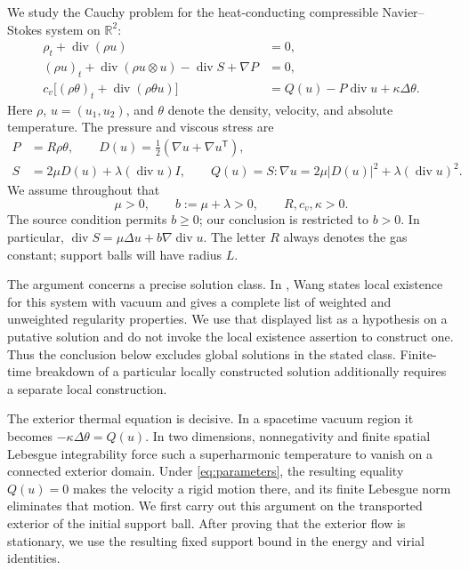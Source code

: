 \documentclass[10pt,twoside]{article}
\newcommand{\R}{\mathbb R}
\newcommand{\Div}{\operatorname{div}}
\begin{document}
We study the Cauchy problem for the heat-conducting compressible
Navier--Stokes system on $\R^2$:
\begin{align}
 \rho_t+\Div(\rho u)&=0,\label{eq:mass}\\
 (\rho u)_t+\Div(\rho u\otimes u)-\Div S+\nabla P&=0,
 \label{eq:momentum}\\
 c_v\bigl[(\rho\theta)_t+\Div(\rho\theta u)\bigr]
 &=Q(u)-P\Div u+\kappa\Delta\theta.\label{eq:thermal}
\end{align}
Here $\rho$, $u=(u_1,u_2)$, and $\theta$ denote the density, velocity,
and absolute temperature. The pressure and viscous stress are
\begin{equation}
 \begin{aligned}
 P&=R\rho\theta,\qquad
 D(u)=\tfrac12(\nabla u+\nabla u^{\mathsf T}),\\
 S&=2\mu D(u)+\lambda(\Div u)I,\qquad
 Q(u)=S:\nabla u
       =2\mu|D(u)|^2+\lambda(\Div u)^2.
 \end{aligned}\label{eq:stress}
\end{equation}
We assume throughout that
\begin{equation}
 \mu>0,\qquad b:=\mu+\lambda>0,\qquad R,c_v,\kappa>0.
 \label{eq:parameters}
\end{equation}
The source condition \cite[(1.2)]{WangV1} permits $b\ge0$;
our conclusion is restricted to $b>0$.
In particular, $\Div S=\mu\Delta u+b\nabla\Div u$. The letter $R$
always denotes the gas constant; support balls will have radius $L$.

The argument concerns a precise solution class. In
\cite[Theorem 1.1]{WangV1}, Wang states local existence for this system
with vacuum and gives a complete list of weighted and unweighted
regularity properties. We use that displayed list as a hypothesis on
a putative solution and do not invoke the local existence assertion
to construct one. Thus the conclusion below excludes global
solutions in the stated class. Finite-time breakdown of a particular
locally constructed solution additionally requires a separate local
construction.

The exterior thermal equation is decisive. In a spacetime vacuum
region it becomes $-\kappa\Delta\theta=Q(u)$. In two dimensions,
nonnegativity and finite spatial Lebesgue integrability force such a
superharmonic temperature to vanish on a connected exterior domain.
Under \eqref{eq:parameters}, the resulting equality $Q(u)=0$ makes the
velocity a rigid motion there, and its finite Lebesgue norm eliminates
that motion. We first carry out this argument on the transported
exterior of the initial support ball. After proving that the exterior
flow is stationary, we use the resulting fixed support bound in the
energy and virial identities.
\end{document}
